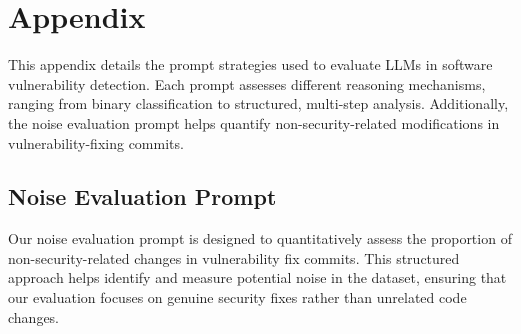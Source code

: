 \documentclass[sigconf,review,anonymous]{acmart}
\begin{document}



\section{Appendix}
\twocolumn

This appendix details the prompt strategies used to evaluate LLMs in software vulnerability detection. Each prompt assesses different reasoning mechanisms, ranging from binary classification to structured, multi-step analysis. Additionally, the noise evaluation prompt helps quantify non-security-related modifications in vulnerability-fixing commits.

\subsection{Noise Evaluation Prompt}
Our noise evaluation prompt is designed to quantitatively assess the proportion of non-security-related changes in vulnerability fix commits. This structured approach helps identify and measure potential noise in the dataset, ensuring that our evaluation focuses on genuine security fixes rather than unrelated code changes.
\end{document}
